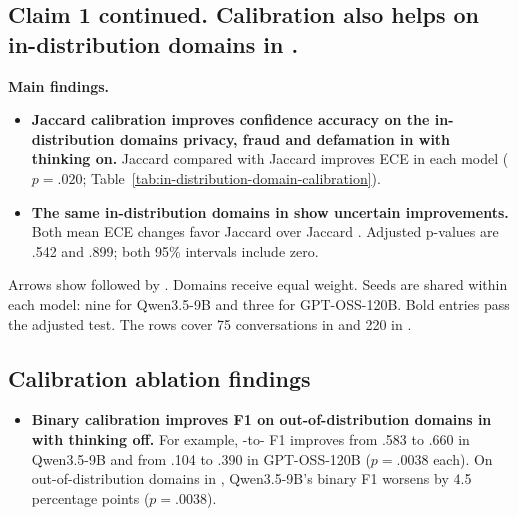 \begingroup\fontsize{9.2}{10.0}\selectfont\setlength{\parskip}{0.10em}
\subsection*{Claim 1 continued. Calibration also helps on in-distribution domains in \SP{}.}
\textbf{Main findings.}
\begin{itemize}
\item \textbf{Jaccard calibration improves confidence accuracy on the in-distribution domains privacy, fraud and defamation in \SP{} with thinking on.}
Jaccard \armB{} compared with Jaccard \armA{} improves ECE in each model ($p=.020$; Table~\ref{tab:in-distribution-domain-calibration}).
\item \textbf{The same in-distribution domains in \DB{} show uncertain improvements.}
Both mean ECE changes favor Jaccard \armB{} over Jaccard \armA{}. Adjusted p-values are .542 and .899; both 95\% intervals include zero.
\end{itemize}
 Arrows show \armA{} followed by \armB{}. Domains receive equal weight. Seeds are shared within each model: nine for Qwen3.5-9B and three for GPT-OSS-120B. Bold entries pass the adjusted test. The rows cover 75 conversations in \SP{} and 220 in \DB{}.
\par\smallskip\par\smallskip

\subsection*{Calibration ablation findings}
\begin{itemize}
\item \textbf{Binary calibration improves F1 on out-of-distribution domains in \SP{} with thinking off.} For example, \armA{}-to-\armB{} F1 improves from .583 to .660 in Qwen3.5-9B and from .104 to .390 in GPT-OSS-120B ($p=.0038$ each). On out-of-distribution domains in \DB{}, Qwen3.5-9B's binary F1 worsens by 4.5 percentage points ($p=.0038$).
\end{itemize}
